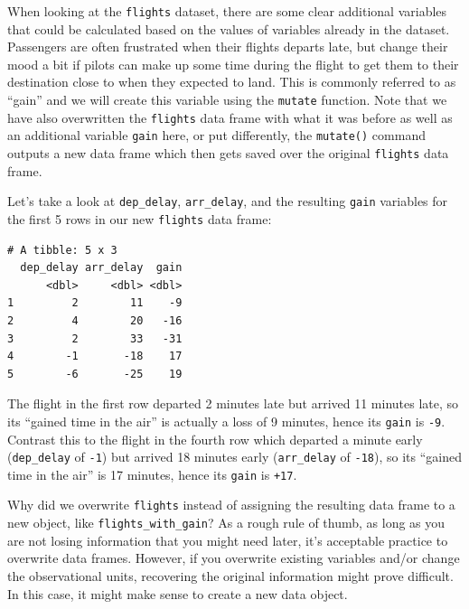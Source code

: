 \documentclass[12pt,]{krantz}
\makeatletter
\newenvironment{Shaded}{\begin{snugshade}}{\end{snugshade}}
\newcommand{\KeywordTok}[1]{\textcolor[rgb]{0.27,0.27,0.27}{\textbf{#1}}}
\newcommand{\DataTypeTok}[1]{\textcolor[rgb]{0.27,0.27,0.27}{#1}}
\newcommand{\StringTok}[1]{\textcolor[rgb]{0.5,0.5,0.5}{#1}}
\newcommand{\OperatorTok}[1]{\textcolor[rgb]{0.43,0.43,0.43}{\textbf{#1}}}
\newcommand{\NormalTok}[1]{#1}
\newenvironment{kframe}{%
\medskip{}
\setlength{\fboxsep}{.8em}
 \def\at@end@of@kframe{}%
 \ifinner\ifhmode%
  \def\at@end@of@kframe{\end{minipage}}%
  \begin{minipage}{\columnwidth}%
 \fi\fi%
 \def\FrameCommand##1{\hskip\@totalleftmargin \hskip-\fboxsep
 \colorbox{shadecolor}{##1}\hskip-\fboxsep
     \hskip-\linewidth \hskip-\@totalleftmargin \hskip\columnwidth}%
 \MakeFramed {\advance\hsize-\width
   \@totalleftmargin\z@ \linewidth\hsize
   \@setminipage}}%
 {\par\unskip\endMakeFramed%
 \at@end@of@kframe}
\renewenvironment{Shaded}{\begin{kframe}}{\end{kframe}}
\makeatother
\begin{document}
When looking at the \texttt{flights} dataset, there are some clear
additional variables that could be calculated based on the values of
variables already in the dataset. Passengers are often frustrated when
their flights departs late, but change their mood a bit if pilots can
make up some time during the flight to get them to their destination
close to when they expected to land. This is commonly referred to as
``gain'' and we will create this variable using the \texttt{mutate}
function. Note that we have also overwritten the \texttt{flights} data
frame with what it was before as well as an additional variable
\texttt{gain} here, or put differently, the \texttt{mutate()} command
outputs a new data frame which then gets saved over the original
\texttt{flights} data frame.

\begin{Shaded}
\end{Shaded}

Let's take a look at \texttt{dep\_delay}, \texttt{arr\_delay}, and the
resulting \texttt{gain} variables for the first 5 rows in our new
\texttt{flights} data frame:

\begin{verbatim}
# A tibble: 5 x 3
  dep_delay arr_delay  gain
      <dbl>     <dbl> <dbl>
1         2        11    -9
2         4        20   -16
3         2        33   -31
4        -1       -18    17
5        -6       -25    19
\end{verbatim}

The flight in the first row departed 2 minutes late but arrived 11
minutes late, so its ``gained time in the air'' is actually a loss of 9
minutes, hence its \texttt{gain} is \texttt{-9}. Contrast this to the
flight in the fourth row which departed a minute early
(\texttt{dep\_delay} of \texttt{-1}) but arrived 18 minutes early
(\texttt{arr\_delay} of \texttt{-18}), so its ``gained time in the air''
is 17 minutes, hence its \texttt{gain} is \texttt{+17}.

Why did we overwrite \texttt{flights} instead of assigning the resulting
data frame to a new object, like \texttt{flights\_with\_gain}? As a
rough rule of thumb, as long as you are not losing information that you
might need later, it's acceptable practice to overwrite data frames.
However, if you overwrite existing variables and/or change the
observational units, recovering the original information might prove
difficult. In this case, it might make sense to create a new data
object.
\end{document}
